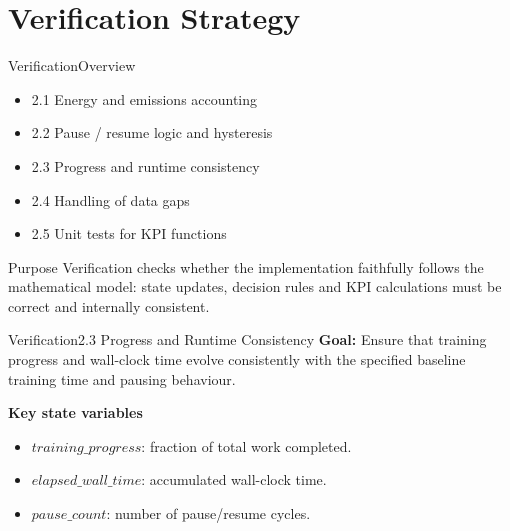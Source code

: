
\section{Verification Strategy}

\begin{frame}{Verification}{Overview}
  \begin{itemize}
    \item 2.1 Energy and emissions accounting
    \item 2.2 Pause / resume logic and hysteresis
    \item 2.3 Progress and runtime consistency
    \item 2.4 Handling of data gaps
    \item 2.5 Unit tests for KPI functions
  \end{itemize}
  \vspace{0.5cm}
  \begin{block}{Purpose}
    Verification checks whether the implementation faithfully follows the
    mathematical model: state updates, decision rules and KPI calculations
    must be correct and internally consistent.
  \end{block}
\end{frame}


\begin{frame}{Verification}{2.3 Progress and Runtime Consistency}
  \textbf{Goal:} Ensure that training progress and wall-clock time evolve
  consistently with the specified baseline training time and pausing behaviour.
  \vspace{0.3cm}

  \textbf{Key state variables}
  \begin{itemize}
    \item $\mathit{training\_progress}$: fraction of total work completed.
    \item $\mathit{elapsed\_wall\_time}$: accumulated wall-clock time.
    \item $\mathit{pause\_count}$: number of pause/resume cycles.
  \end{itemize}
\end{frame}

